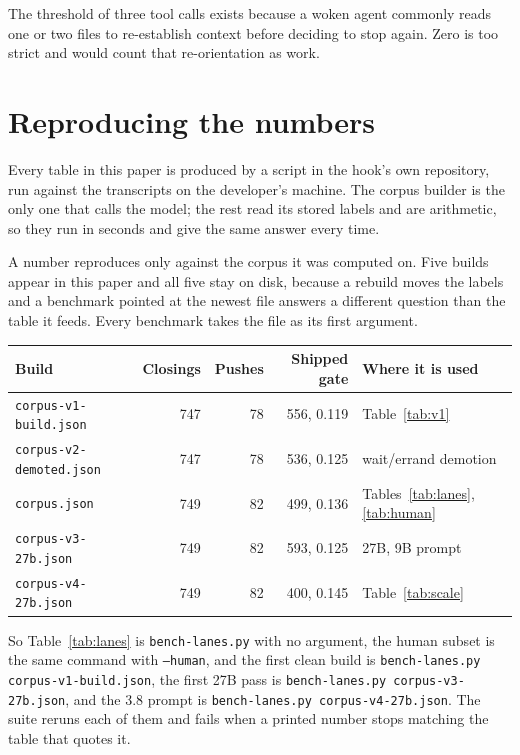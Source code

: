 The threshold of three tool calls exists because a woken agent commonly reads
one or two files to re-establish context before deciding to stop again. Zero is
too strict and would count that re-orientation as work.

\section{Reproducing the numbers}
\label{app:repro}

Every table in this paper is produced by a script in the hook's own
repository, run against the transcripts on the developer's machine. The
corpus builder is the only one that calls the model; the rest read its stored
labels and are arithmetic, so they run in seconds and give the same answer
every time.

A number reproduces only against the corpus it was computed on. Five builds
appear in this paper and all five stay on disk, because a rebuild moves the
labels and a benchmark pointed at the newest file answers a different
question than the table it feeds. Every benchmark takes the file as its first
argument.

\begin{center}
{\small\begin{tabular}{lrrrp{3.8cm}}
\toprule
Build & Closings & Pushes & Shipped gate & Where it is used \\
\midrule
\texttt{corpus-v1-build.json} & 747 & 78 & 556, 0.119 & Table~\ref{tab:v1} \\
\texttt{corpus-v2-demoted.json} & 747 & 78 & 536, 0.125 & wait/errand demotion \\
\texttt{corpus.json} & 749 & 82 & 499, 0.136 & Tables~\ref{tab:lanes}, \ref{tab:human} \\
\texttt{corpus-v3-27b.json} & 749 & 82 & 593, 0.125 & 27B, 9B prompt \\
\texttt{corpus-v4-27b.json} & 749 & 82 & 400, 0.145 & Table~\ref{tab:scale} \\
\bottomrule
\end{tabular}}
\end{center}

So Table~\ref{tab:lanes} is \texttt{bench-lanes.py} with no argument, the
human subset is the same command with \texttt{--human}, and the first clean
build is \texttt{bench-lanes.py corpus-v1-build.json}, the first 27B pass is
\texttt{bench-lanes.py corpus-v3-27b.json}, and the 3.8 prompt is
\texttt{bench-lanes.py corpus-v4-27b.json}. The suite reruns each of them
and fails when a printed number stops matching the table that quotes it.

